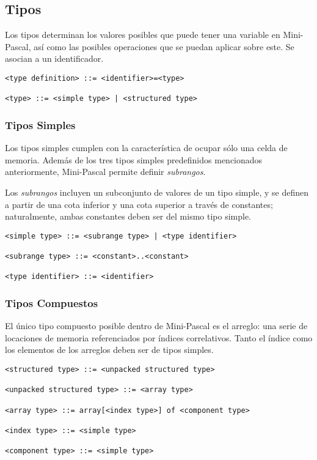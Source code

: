 \documentclass[a4paper,oneside]{report}
\begin{document}
\subsection{Tipos}

Los tipos determinan los valores posibles que puede tener una variable en Mini-Pascal, así como las posibles operaciones que se puedan aplicar sobre este. Se asocian a un identificador.

\begin{verbatim}
<type definition> ::= <identifier>=<type>

<type> ::= <simple type> | <structured type>
\end{verbatim}


\subsubsection{Tipos Simples}

Los tipos simples cumplen con la característica de ocupar sólo una celda de memoria. Además de los tres tipos simples predefinidos  mencionados anteriormente, Mini-Pascal permite definir \textit{subrangos}.

Los \textit{subrangos} incluyen un subconjunto de valores de un tipo simple, y se definen a partir de una cota inferior y una cota superior a través de constantes; naturalmente, ambas constantes deben ser del mismo tipo simple.

\begin{verbatim}
<simple type> ::= <subrange type> | <type identifier>

<subrange type> ::= <constant>..<constant>

<type identifier> ::= <identifier>
\end{verbatim}

\subsubsection{Tipos Compuestos}

El único tipo compuesto posible dentro de Mini-Pascal es el arreglo: una serie de locaciones de memoria referenciados por índices correlativos. Tanto el índice como los elementos de los arreglos deben ser de tipos simples.
\begin{verbatim}
<structured type> ::= <unpacked structured type>

<unpacked structured type> ::= <array type>

<array type> ::= array[<index type>] of <component type>

<index type> ::= <simple type>

<component type> ::= <simple type>
\end{verbatim}
\end{document}
